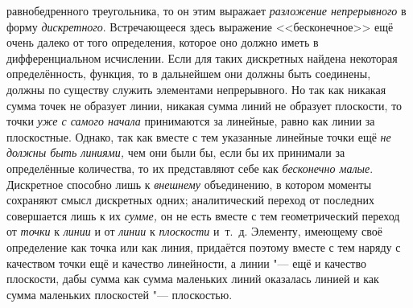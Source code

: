 равнобедренного треугольника, то он этим выражает {\em разложение непрерывного}
в форму {\em дискретного}. Встречающееся здесь выражение <<бесконечное>> ещё
очень далеко от того определения, которое оно должно иметь в дифференциальном
исчислении. Если для таких дискретных найдена некоторая определённость,
функция, то в дальнейшем они должны быть соединены, должны по существу служить
элементами непрерывного. Но так как никакая сумма точек не образует линии,
никакая сумма линий не образует плоскости, то точки {\em уже с самого начала}
принимаются за линейные, равно как линии за плоскостные. Однако, так как вместе
с тем указанные линейные точки ещё {\em не должны быть линиями,} чем они были
бы, если бы их принимали за определённые количества, то их представляют себе
как {\em бесконечно малые}. Дискретное способно лишь к {\em внешнему}
объединению, в котором моменты сохраняют смысл дискретных одних; аналитический
переход от последних совершается лишь к их {\em сумме,} он не есть вместе с тем
геометрический переход от {\em точки} к {\em линии} и от {\em линии} к
{\em плоскости} и~т.~д. Элементу, имеющему своё определение как точка или как
линия, придаётся поэтому вместе с тем наряду с качеством точки ещё и качество
линейности, а линии "--- ещё и качество плоскости, дабы сумма как сумма
маленьких линий оказалась линией и как сумма маленьких плоскостей "---
плоскостью.

